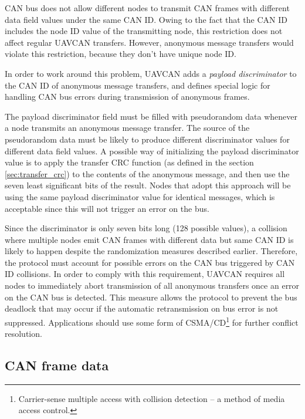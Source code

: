 CAN bus does not allow different nodes to transmit CAN frames with different data field values under the same CAN ID.
Owing to the fact that the CAN ID includes the node ID value of the transmitting node,
this restriction does not affect regular UAVCAN transfers.
However, anonymous message transfers would violate this restriction,
because they don't have unique node ID.

In order to work around this problem,
UAVCAN adds a \emph{payload discriminator} to the CAN ID of anonymous message transfers,
and defines special logic for handling CAN bus errors during transmission of anonymous frames.

The payload discriminator field must be filled with pseudorandom data whenever a node transmits an
anonymous message transfer.
The source of the pseudorandom data must be likely to produce different discriminator values
for different data field values.
A possible way of initializing the payload discriminator value is to apply the transfer CRC function
(as defined in the section \ref{sec:transfer_crc})
to the contents of the anonymous message, and then use the seven least significant bits of the result.
Nodes that adopt this approach will be using the same payload discriminator value for identical messages,
which is acceptable since this will not trigger an error on the bus.

Since the discriminator is only seven bits long (128 possible values),
a collision where multiple nodes emit CAN frames with different data but same CAN ID is likely to happen
despite the randomization measures described earlier.
Therefore, the protocol must account for possible errors on the CAN bus triggered by CAN ID collisions.
In order to comply with this requirement,
UAVCAN requires all nodes to immediately abort transmission of all anonymous transfers once an error on
the CAN bus is detected.
This measure allows the protocol to prevent the bus deadlock that may occur if the automatic
retransmission on bus error is not suppressed.
Applications should use some form of CSMA/CD\footnote{Carrier-sense multiple access with collision detection
-- a method of media access control.} for further conflict resolution.

\subsection{CAN frame data}


